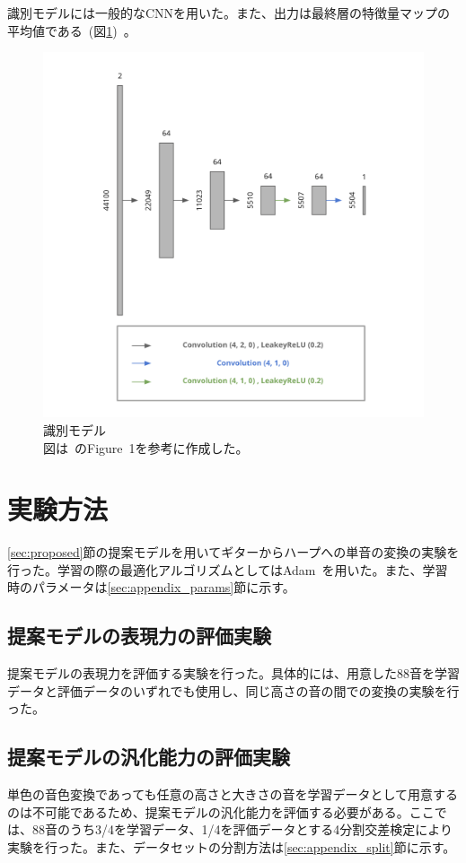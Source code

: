 識別モデルには一般的なCNNを用いた。また、出力は最終層の特徴量マップの平均値である~(図\ref{fig:pr_dis})~。

\begin{figure}[b]
\begin{center}
\includegraphics[width=0.6\hsize]{figure/pr_discriminator.png}
\caption{識別モデル\\
図は~\cite{u-net}のFigure~1を参考に作成した。}
\label{fig:pr_dis}
\end{center}
\end{figure}

\section{実験方法}

\ref{sec:proposed}節の提案モデルを用いてギターからハープへの単音の変換の実験を行った。学習の際の最適化アルゴリズムとしてはAdam~\cite{Adam}を用いた。また、学習時のパラメータは\ref{sec:appendix_params}節に示す。

\subsection{提案モデルの表現力の評価実験}

提案モデルの表現力を評価する実験を行った。具体的には、用意した88音を学習データと評価データのいずれでも使用し、同じ高さの音の間での変換の実験を行った。

\subsection{提案モデルの汎化能力の評価実験}

単色の音色変換であっても任意の高さと大きさの音を学習データとして用意するのは不可能であるため、提案モデルの汎化能力を評価する必要がある。ここでは、88音のうち3/4を学習データ、1/4を評価データとする4分割交差検定により実験を行った。また、データセットの分割方法は\ref{sec:appendix_split}節に示す。

